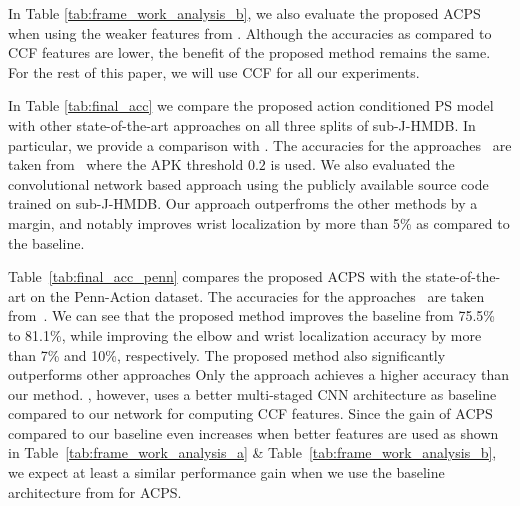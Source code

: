 \documentclass[a4paper, 10pt, conference]{ieeeconf}      \usepackage{FG2017}
\begin{document}
In Table \ref{tab:frame_work_analysis_b}, we also evaluate the proposed ACPS when using the weaker features from \cite{dantone_tpami2014}. Although the accuracies as compared to CCF features are lower, the benefit of the proposed method remains the same. For the rest of this paper, we will use CCF for all our experiments.




	
	
	

In Table \ref{tab:final_acc} we compare the proposed action conditioned PS model with other state-of-the-art approaches on all three splits of sub-J-HMDB. In particular, we provide a comparison with \cite{dantone_tpami2014, yang_tpami2014, bruce_cvpr2015, park_iccv2011, cherian_cvpr2014, chen_nips2014}. The accuracies for the approaches~\cite{yang_tpami2014, bruce_cvpr2015, park_iccv2011, cherian_cvpr2014} are taken from~\cite{bruce_cvpr2015} where the APK threshold $0.2$ is used. We also evaluated the convolutional network based approach \cite{chen_nips2014} using the publicly available source code trained on sub-J-HMDB. Our approach outperfroms the other methods by a margin, and notably improves wrist localization by more than 5\% as compared to the baseline. 

Table~\ref{tab:final_acc_penn} compares the proposed ACPS with the state-of-the-art on the Penn-Action dataset. The accuracies for the approaches~\cite{yang_tpami2014, bruce_cvpr2015, park_iccv2011} are taken from~\cite{bruce_cvpr2015}. We can see that the proposed method improves the baseline from 75.5\% to 81.1\%, while improving the elbow and wrist localization accuracy by more than 7\% and 10\%, respectively.  The proposed method also significantly outperforms other approaches Only the approach \cite{georgia2016eccv} achieves a higher accuracy than our method. \cite{georgia2016eccv}, however, uses a better multi-staged CNN architecture as baseline compared to our network for computing CCF features. Since the gain of ACPS compared to our baseline even increases when better features are used as shown in  Table~\ref{tab:frame_work_analysis_a} \& Table~\ref{tab:frame_work_analysis_b}, we expect at least a similar performance gain when we use the baseline architecture from \cite{georgia2016eccv} for ACPS.
\end{document}
